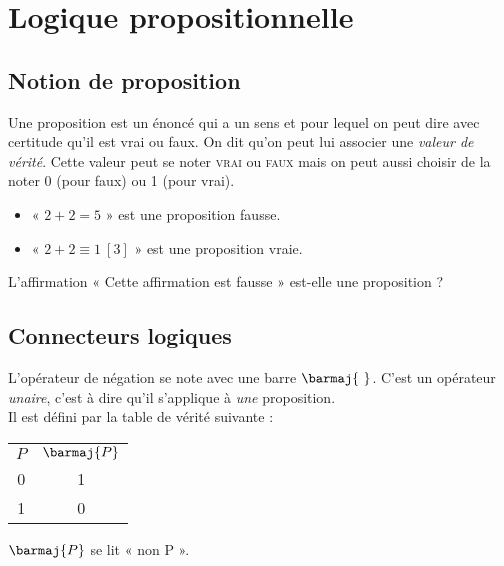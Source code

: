 \chapter{Logique propositionnelle}
\section{Notion de proposition}


\begin{definition}[ : proposition]
	Une proposition est un énoncé qui a un sens et pour lequel on peut dire avec certitude qu'il est vrai ou faux. On dit qu'on peut lui associer une \textit{valeur de vérité}. Cette valeur peut se noter \textsc{vrai} ou \textsc{faux} mais on peut aussi choisir de la noter 0 (pour faux) ou 1 (pour vrai).
\end{definition}
\begin{exemple}[s]
	\begin{itemize}
		\item 	« $2+2 = 5$ » est une proposition fausse.
		\item 	« $2+2\equiv 1\ [3]$ » est une proposition vraie.
	\end{itemize}
\end{exemple}

\begin{exercice}[]
	L'affirmation « Cette affirmation est fausse » est-elle une proposition ?
\end{exercice}
\section{Connecteurs logiques}
\begin{definition}
	L'opérateur de négation se note avec une barre $\barmaj{\ }$. C'est un opérateur \textit{unaire}, c'est à dire qu'il s'applique à \textit{une} proposition.\\
	Il est défini par la table de vérité suivante :
	\tabstyle[UGLiGreen]
	\begin{center}
		\begin{tabular}{|c|c|}
			\ccell $P$ & \ccell $\barmaj{ P}$ \\
			0          & 1                    \\
			1          & 0                    \\
		\end{tabular}
	\end{center}
	$\barmaj{P}$ se lit « non P ».
\end{definition}

